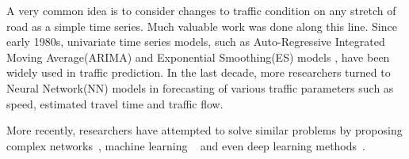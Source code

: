 A very common idea is to consider changes to traffic condition
on any stretch of road as a simple time series. 
Much valuable work was done along this line. Since early 1980s, 
univariate time series models, such as Auto-Regressive Integrated 
Moving Average(ARIMA)\cite{ARIMA} and Exponential Smoothing(ES) 
models \cite{ES}, have been widely used in traffic prediction. 
In the last decade, more researchers turned to Neural Network(NN) 
models in forecasting of various traffic parameters such as 
speed\cite{Ishak2004Optimizing}, 
estimated travel time\cite{Lint2005Accurate} and 
traffic flow.  

More recently, researchers 
have attempted to solve similar problems by proposing 
complex networks~\cite{Colak2016, Ren2014}, machine learning
~\cite{Qi2014,
Zhang2015Hybrid} 
and even deep learning methods~\cite{Chan2012Neural}. 
		
